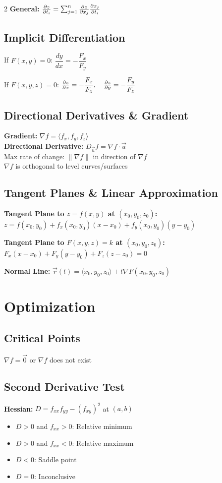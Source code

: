 \documentclass[8pt]{extarticle}
\begin{document}
\begin{multicols}{2}
\textbf{General:} $\pdv{z}{t_i} = \sum_{j=1}^n \pdv{z}{x_j}\pdv{x_j}{t_i}$

\subsection*{Implicit Differentiation}
If $F(x,y) = 0$: $\dfrac{dy}{dx} = -\dfrac{F_x}{F_y}$

If $F(x,y,z) = 0$: $\pdv{z}{x} = -\dfrac{F_x}{F_z}, \quad \pdv{z}{y} = -\dfrac{F_y}{F_z}$

\subsection*{Directional Derivatives \& Gradient}
\textbf{Gradient:} $\nabla f = \langle f_x, f_y, f_z \rangle$ \\
\textbf{Directional Derivative:} $D_{\vec{u}}f = \nabla f \cdot \vec{u}$ \\
Max rate of change: $\|\nabla f\|$ in direction of $\nabla f$ \\
$\nabla f$ is orthogonal to level curves/surfaces

\subsection*{Tangent Planes \& Linear Approximation}
\textbf{Tangent Plane to $z=f(x,y)$ at $(x_0,y_0,z_0)$:} \\
$z = f(x_0,y_0) + f_x(x_0,y_0)(x-x_0) + f_y(x_0,y_0)(y-y_0)$

\textbf{Tangent Plane to $F(x,y,z)=k$ at $(x_0,y_0,z_0)$:} \\
$F_x(x-x_0) + F_y(y-y_0) + F_z(z-z_0) = 0$

\textbf{Normal Line:} $\vec{r}(t) = \langle x_0,y_0,z_0 \rangle + t\nabla F(x_0,y_0,z_0)$

\section*{Optimization}

\subsection*{Critical Points}
$\nabla f = \vec{0}$ or $\nabla f$ does not exist

\subsection*{Second Derivative Test}
\textbf{Hessian:} $D = f_{xx}f_{yy} - (f_{xy})^2$ at $(a,b)$
\begin{itemize}[leftmargin=*,nosep]
\item $D > 0$ and $f_{xx} > 0$: Relative minimum
\item $D > 0$ and $f_{xx} < 0$: Relative maximum
\item $D < 0$: Saddle point
\item $D = 0$: Inconclusive
\end{itemize}


\end{multicols}
\end{document}

